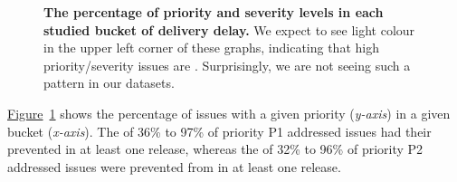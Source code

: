 \begin{figure}
	\caption{\textbf{The percentage of priority and severity levels in each
		studied bucket of delivery delay.} We expect to see light
		colour in the upper left corner of these graphs, indicating that
		high priority/severity issues are \DIFdelbeginFL {}\DIFdelendFL \DIFaddbeginFL {}\DIFaddendFL .
	Surprisingly, we are not seeing such a pattern in our datasets.}
	\label{ch4:fig:heatMaps}
\end{figure}

\hyperref[ch4:fig:heatMaps]{Figure}~\ref{ch4:fig:heatMaps} shows the percentage of
issues with a given priority (\textit{y-axis}) in a given \DIFdelbegin {}\DIFdelend \DIFaddbegin {}\DIFaddend bucket
(\textit{x-axis}). The \DIFdelbegin {}\DIFdelend \DIFaddbegin {}\DIFaddend of 36\% to 97\% of priority P1 addressed issues
had their \DIFdelbegin {}\DIFdelend \DIFaddbegin {}\DIFaddend prevented in at least one release, whereas the \DIFdelbegin {}\DIFdelend \DIFaddbegin {}\DIFaddend of 32\% to 96\% of priority P2 addressed issues were prevented from \DIFdelbegin {}\DIFdelend \DIFaddbegin {}\DIFaddend in
at least one release. 

